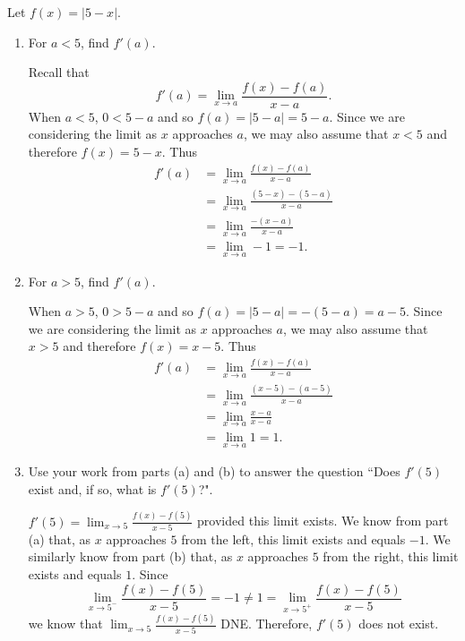 \documentclass[nooutcomes]{ximera}
\begin{document}
\begin{problem}
Let $f(x) = |5-x|$.
	
	\begin{enumerate}
	
	\item For $a < 5$, find $f'(a)$.
	
		\begin{freeResponse}
		Recall that 
		$$f'(a) = \lim_{x \to a} \frac{f(x) - f(a)}{x-a}.$$
		When $a < 5$, $0 < 5-a$ and so $f(a) = |5-a| = 5-a$.  Since we are considering the limit as $x$ approaches $a$, we may also assume that $x < 5$ and therefore $f(x) = 5-x$.  Thus
		\begin{align*}
		f'(a) &= \lim_{x \to a} \frac{f(x) - f(a)}{x-a}  \\
		&= \lim_{x \to a} \frac{(5-x) - (5-a)}{x-a}  \\
		&= \lim_{x \to a} \frac{-(x-a)}{x-a}  \\
		&= \lim_{x \to a} -1 = -1.
		\end{align*}
		\end{freeResponse}
		
		
	
	\item For $a > 5$, find $f'(a)$.
	
		\begin{freeResponse}
		When $a > 5$, $0 > 5-a$ and so $f(a) = |5-a| = -(5-a) = a-5$.  Since we are considering the limit as $x$ approaches $a$, we may also assume that $x > 5$ and therefore $f(x) = x-5$.  Thus
		\begin{align*}
		f'(a) &= \lim_{x \to a} \frac{f(x) - f(a)}{x-a}  \\
		&= \lim_{x \to a} \frac{(x-5) - (a-5)}{x-a}  \\
		&= \lim_{x \to a} \frac{x-a}{x-a}  \\
		&= \lim_{x \to a} 1 = 1.
		\end{align*}

		\end{freeResponse}
		
		
	
	\item Use your work from parts (a) and (b) to answer the question ``Does $f'(5)$ exist and, if so, what is $f'(5)$?".
	
		\begin{freeResponse}
		$f'(5) = \lim_{x \to 5} \frac{f(x) - f(5)}{x-5}$ provided this limit exists.  We know from part (a) that, as $x$ approaches $5$ from the left, this limit exists and equals $-1$.  We similarly know from part (b) that, as $x$ approaches $5$ from the right, this limit exists and equals $1$.  Since 
		$$\lim_{x \to 5^-} \frac{f(x) - f(5)}{x-5} = -1 \neq 1 = \lim_{x \to 5^+} \frac{f(x) - f(5)}{x-5}$$
		we know that $\lim_{x \to 5} \frac{f(x) - f(5)}{x-5}$ DNE.  Therefore, $f'(5)$ does not exist.
		\end{freeResponse}
		

\end{enumerate}
\end{problem}
\end{document}
